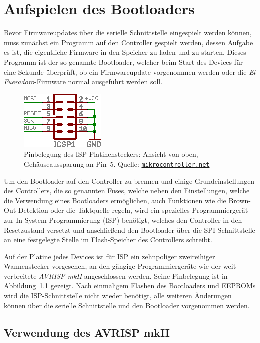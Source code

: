 \documentclass[pdftex, parskip, numbers=noenddot, toc=listof]{scrbook}
\newcommand{\anlage}{\emph{El Fueradoro}}
\begin{document}
	\chapter{Aufspielen des Bootloaders}
	\label{ch:bootloader}

	Bevor Firmwareupdates über die serielle Schnittstelle eingespielt werden können, muss zunächst ein Programm auf den Controller gespielt werden, dessen Aufgabe es ist, die eigentliche Firmware in den Speicher zu laden und zu starten. Dieses Programm ist der so genannte Bootloader, welcher beim Start des Devices für eine Sekunde überprüft, ob ein Firmwareupdate vorgenommen werden oder die {\anlage}-Firmware normal ausgeführt werden soll.

	\begin{figure}[!h]
		\centering
		\includegraphics[width=.35\textwidth]{Bilder/isp}
		\caption{Pinbelegung des ISP-Platinensteckers: Ansicht von oben, Gehäuseaussparung an Pin~5. Quelle: \href{http://www.mikrocontroller.net}{\texttt{mikrocontroller.net}}}
		\label{fig:isp}
	\end{figure}

	Um den Bootloader auf den Controller zu brennen und einige Grundeinstellungen des Controllers, die so genannten Fuses, welche neben den Einstellungen, welche die Verwendung eines Bootloaders ermöglichen, auch Funktionen wie die Brown-Out-Detektion oder die Taktquelle regeln, wird ein spezielles Programmiergerät zur In-System-Programmierung (ISP) benötigt, welches den Controller in den Resetzustand versetzt und anschließend den Bootloader über die SPI-Schnittstelle an eine festgelegte Stelle im Flash-Speicher des Controllers schreibt.

	Auf der Platine jedes Devices ist für ISP ein zehnpoliger zweireihiger Wannenstecker vorgesehen, an den gängige Programmiergeräte wie der weit verbreitete \emph{AVRISP mkII} angeschlossen werden. Seine Pinbelegung ist in Abbildung~\ref{fig:isp} gezeigt. Nach einmaligem Flashen des Bootloaders und EEPROMs wird die ISP-Schnittstelle nicht wieder benötigt, alle weiteren Änderungen können über die serielle Schnittstelle und den Bootloader vorgenommen werden.

	\section{Verwendung des AVRISP mkII}
\end{document}
